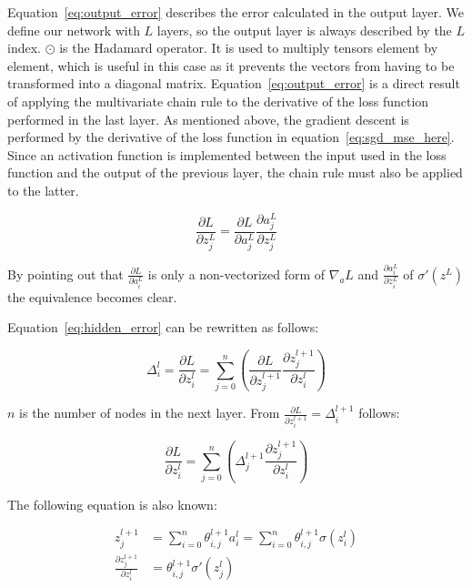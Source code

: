 Equation~\eqref{eq:output_error} describes the error calculated in the output layer. We define our network with $L$ layers, so the output layer is always described by the $L$ index.
$\odot$ is the Hadamard operator. It is used to multiply tensors element by element, which is useful in this case as it prevents the vectors from having to be transformed into a diagonal matrix.
Equation~\eqref{eq:output_error} is a direct result of applying the multivariate chain rule to the derivative of the loss function performed in the last layer.
As mentioned above, the gradient descent is performed by the derivative of the loss function in equation~\eqref{eq:sgd_mse_here}.
Since an activation function is implemented between the input used in the loss function and the output of the previous layer, the chain rule must also be applied to the latter.

\begin{equation}
    \frac{\partial L}{\partial z^L_j} = \frac{\partial L}{\partial a^L_j}\frac{\partial a^L_j}{\partial z^L_j}
    \label{eq:proof_loss_chain_rule}
\end{equation}

By pointing out that $\frac{\partial L}{\partial a^L_i}$ is only a non-vectorized form of $\nabla_a L$ and $\frac{\partial a^L_i}{\partial z^L_i}$ of $\sigma'(z^L)$ the equivalence becomes clear.

Equation~\eqref{eq:hidden_error} can be rewritten as follows:

\begin{equation}
    \varDelta^l_i = \frac{\partial L}{\partial z^l_i} = \sum_{j=0}^n (\frac{\partial L}{\partial z^{l+1}_j}\frac{\partial z^{l+1}_j}{\partial z^l_i})
\end{equation}

$n$ is the number of nodes in the next layer. From $\frac{\partial L}{\partial z^{l+1}_i} = \varDelta^{l+1}_i$ follows:

\begin{equation}
    \frac{\partial L}{\partial z^l_i} = \sum_{j=0}^n (\varDelta^{l+1}_j \frac{\partial z^{l+1}_j}{\partial z^{l}_i})
    \label{eq:hidden_error_intermediate}
\end{equation}

The following equation is also known:

\begin{equation}
    \begin{split}
    z^{l+1}_j & = \sum_{i=0}^n \theta^{l+1}_{i,j} a^l_i = \sum_{i=0}^n \theta^{l+1}_{i, j} \sigma(z^l_i) \\
    \frac{\partial z_j^{l+1}}{\partial z_i^l} & = \theta^{l+1}_{i,j} \sigma'(z^l_j)
    \end{split}
\end{equation}

